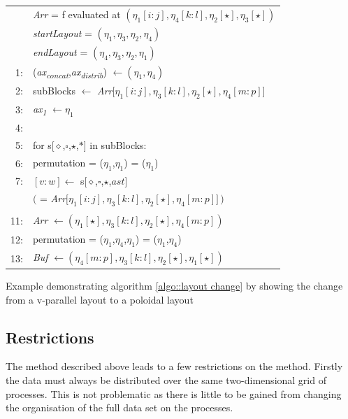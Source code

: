 \begin{Example}
\begin{tabular}{rl}
 & {\em Arr} = f evaluated at $(\eta_1[i:j], \eta_4[k:l], \eta_2[\star], \eta_3[\star])$\\
 & {\em startLayout} = $(\eta_1 , \eta_3 , \eta_2 , \eta_4 )$\\
 & {\em endLayout} =  $(\eta_4 , \eta_3 , \eta_2 , \eta_1 )$\\
 
 1: & ({\em ax\textsubscript{concat}},{\em ax\textsubscript{distrib}}) $\leftarrow (\eta_1,\eta_4)$\\
 2: & subBlocks $\leftarrow$ {\em Arr}$\big[\eta_1[i:j], \eta_3[k:l], \eta_2[\star], \eta_4[m:p]\big]$\\
 3: & {\em ax\textsubscript{1}} $\leftarrow \eta_1$\\
 4: & \\
 5: & for s[$\diamond$,$\square$,$\star$,$\ast$] in subBlocks:\\
 6: & \hspace*{2em} permutation = ($\eta_1$,$\eta_1$) = ($\eta_1$)\\
 7: & \hspace*{2em}{\em Buf}$[v:w] \leftarrow$ s[$\diamond$,$\square$,$\star$,$ast$]\\
 & \hspace*{7em} $\big($ = {\em Arr}$\big[\eta_1[i:j], \eta_3[k:l], \eta_2[\star], \eta_4[m:p]\big]\, \big)$\\
 \\
 11: & {\em Arr} $\leftarrow (\eta_1[\star], \eta_3[k:l], \eta_2[\star], \eta_4[m:p])$\\
 12: & permutation = ($\eta_1$,$\eta_4$,$\eta_1$) = ($\eta_1$,$\eta_4$)\\
 13: & {\em Buf} $\leftarrow (\eta_4[m:p], \eta_3[k:l], \eta_2[\star], \eta_1[\star])$\\
\end{tabular}
 \caption{\label{example::layout change2}Example demonstrating algorithm \ref{algo::layout change} by showing the change from a v-parallel layout to a poloidal layout}
\end{Example}

\subsection{Restrictions}

The method described above leads to a few restrictions on the method. Firstly the data must always be distributed over the same two-dimensional grid of processes. This is not problematic as there is little to be gained from changing the organisation of the full data set on the processes.

